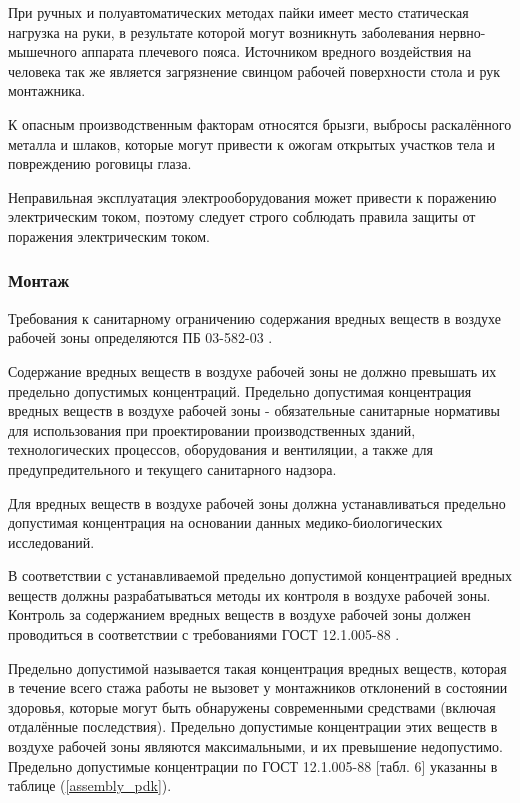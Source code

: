При ручных и полуавтоматических методах пайки имеет место статическая нагрузка на
руки, в результате которой могут возникнуть заболевания нервно-мышечного аппарата
плечевого пояса. Источником вредного воздействия на человека так же является
загрязнение свинцом рабочей поверхности стола и рук монтажника.

К опасным производственным факторам относятся брызги, выбросы раскалённого
металла и шлаков, которые могут привести к ожогам открытых участков тела и
повреждению роговицы глаза.

Неправильная эксплуатация электрооборудования может привести к поражению
электрическим током, поэтому следует строго соблюдать правила защиты от поражения
электрическим током.

\subsubsection{Монтаж}

Требования к санитарному ограничению содержания вредных веществ в воздухе рабочей
зоны определяются ПБ 03-582-03 \cite{ecology_pb_03_582_03}.

Содержание вредных веществ в воздухе рабочей зоны не должно превышать их
предельно допустимых концентраций. Предельно допустимая концентрация вредных
веществ в воздухе рабочей зоны - обязательные санитарные нормативы для
использования при проектировании производственных зданий, технологических
процессов, оборудования и вентиляции, а также для предупредительного и
текущего санитарного надзора.

Для вредных веществ в воздухе рабочей зоны должна устанавливаться предельно
допустимая концентрация на основании данных медико-биологических исследований.

В соответствии с устанавливаемой предельно допустимой концентрацией вредных
веществ должны разрабатываться методы их контроля в воздухе рабочей зоны.
Контроль за содержанием вредных веществ в воздухе рабочей зоны должен проводиться
в соответствии с требованиями ГОСТ 12.1.005-88 \cite{ecology_gost_005_88}.

Предельно допустимой называется такая концентрация вредных веществ, которая в
течение всего стажа работы не вызовет у монтажников отклонений в состоянии
здоровья, которые могут быть обнаружены современными средствами (включая
отдалённые последствия). Предельно допустимые концентрации этих веществ в воздухе
рабочей зоны являются максимальными, и их превышение недопустимо. Предельно
допустимые концентрации по ГОСТ 12.1.005-88 \cite{ecology_gost_005_88}[табл. 6]
указанны в таблице (\ref{assembly_pdk}).

